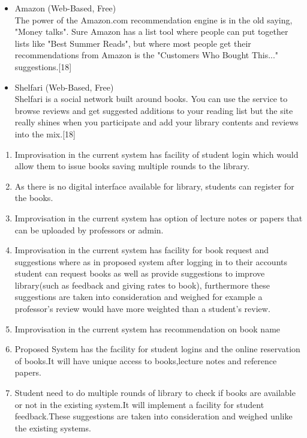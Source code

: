 \documentclass[a4paper,12pt]{report}
\begin{document}
\begin{enumerate}
\begin{itemize}
      \item Amazon (Web-Based, Free)\\
            The power of the Amazon.com recommendation engine is in the old saying, "Money talks". Sure Amazon has a list tool where people can put together lists like "Best Summer Reads", but where most people get their recommendations from Amazon is the "Customers Who Bought This..." suggestions.[18]\\

      \item Shelfari (Web-Based, Free)\\
            Shelfari is a social network built around books. You can use the service to browse reviews and get suggested additions to your reading list but the site really shines when you participate and add your library contents and reviews into the mix.[18]

    \end{itemize}
  \end{enumerate}

\begin{enumerate}

  \item Improvisation in the current system has facility of student login which would allow them to issue books saving multiple rounds to the library.
  \item As there is no digital interface available for library, students can register for the books.
  \item Improvisation in the current system has option of lecture notes or papers that can be uploaded by professors or admin.
  \item Improvisation in the current system has facility for book request and suggestions where as in proposed system after logging in to their accounts student can request books as well as provide suggestions to improve library(such as feedback and giving rates to book), furthermore these suggestions are taken into consideration and weighed for example a professor’s review would have more weighted than a student’s review.
  \item Improvisation in the current system has recommendation on book name
  \item Proposed System has the facility for student logins and the online reservation of books.It will have unique access to books,lecture notes and reference papers.
  \item Student need to do multiple rounds of library to check if books are available or not in the existing system.It will implement a facility for student feedback.These suggestions are taken into consideration and weighed unlike the existing systems.
\end{enumerate}
\end{document}
